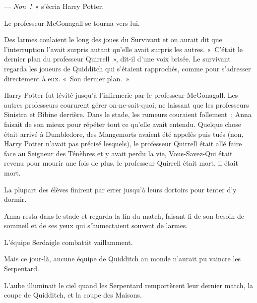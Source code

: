 --- \emph{Non~!}~» s'écria Harry Potter.

Le professeur McGonagall se tourna vers lui.

Des larmes coulaient le long des joues du Survivant et on aurait dit que l'interruption l'avait surpris autant qu'elle avait surpris les autres.
«~C'était le dernier plan du professeur Quirrell~», dit-il d'une voix brisée.
Le survivant regarda les joueurs de Quidditch qui s'étaient rapprochés, comme pour s'adresser directement à eux.
«~Son dernier plan.~»

Harry Potter fut lévité jusqu'à l'infirmerie par le professeur McGonagall.
Les autres professeurs coururent gérer on-ne-sait-quoi, ne laissant que les professeurs Sinistra et Bibine derrière.
Dans le stade, les rumeurs couraient follement~; Anna faisait de son mieux pour répéter tout ce qu'elle avait entendu.
Quelque chose était arrivé à Dumbledore, des Mangemorts avaient été appelés puis tués (non, Harry Potter n'avait pas précisé lesquels), le professeur Quirrell était allé faire face au Seigneur des Ténèbres et y avait perdu la vie, Vous-Savez-Qui était revenu pour mourir une fois de plus, le professeur Quirrell était mort, il était mort.

La plupart des élèves finirent par errer jusqu'à leurs dortoirs pour tenter d'y dormir.

Anna resta dans le stade et regarda la fin du match, faisant fi de son besoin de sommeil et de ses yeux qui s'humectaient souvent de larmes.

L'équipe Serdaigle combattit vaillamment.

Mais ce jour-là, aucune équipe de Quidditch au monde n'aurait pu vaincre les Serpentard.

L'aube illuminait le ciel quand les Serpentard remportèrent leur dernier match, la coupe de Quidditch, et la coupe des Maisons.
